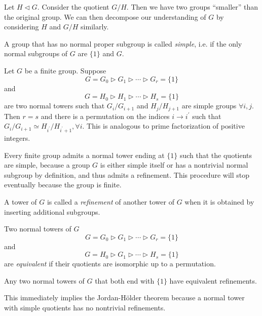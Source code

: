 \documentclass{article}
\begin{document}
Let $H \triangleleft G$. Consider the quotient $G / H$. Then we have
two groups ``smaller'' than the original group. We can then decompose
our understanding of $G$ by considering $H$ and $G/H$ similarly.

\begin{defn}
A group that has no normal proper subgroup is called \emph{simple},
i.e. if the only normal subgroups of $G$ are $\{1\}$ and $G$.
\end{defn}

\begin{theorem}
Let $G$ be a finite group. Suppose 
$$
G = G_0 \triangleright G_1 
        \triangleright \cdots
        \triangleright G_r = \{1\}
$$
and
$$
G = H_0 \triangleright H_1 
        \triangleright \cdots
        \triangleright H_s = \{1\}
$$
are two normal towers such that
$G_i / G_{i+1}$ and $H_j / H_{j+1}$ are simple groups
$\forall i, j$. Then $r = s$ and there is a permutation
on the indices $i \to i^\prime$ such that
$G_i / G_{i+1} \simeq H_{i^\prime} / H_{i^\prime + 1}, \forall
i$. This is analogous to prime factorization of positive integers.
\end{theorem}

\begin{remark}
Every finite group admits a normal tower ending at $\{ 1 \}$ such that
the quotients are simple, because a group $G$ is either simple itself
or has a nontrivial normal subgroup by definition, and thus admits a
refinement. This procedure will stop eventually because the group is finite.
\end{remark}

\begin{defn}[Refinement]
A tower of $G$ is called a \emph{refinement} of another tower of $G$
when it is obtained by inserting additional subgroups.
\end{defn}

\begin{defn}
Two normal towers of $G$ 
$$
G = G_0 \triangleright G_1 
        \triangleright \cdots
        \triangleright G_r = \{1\}
$$
and
$$
G = H_0 \triangleright G_1 
        \triangleright \cdots
        \triangleright H_s = \{1\}
$$
are \emph{equivalent} if their quotients are isomorphic up to a permutation.
\end{defn}

\begin{theorem}[Schreier]
Any two normal towers of $G$ that both end with $\{1\}$ have
equivalent refinements.
\end{theorem}

This immediately implies the Jordan-H\"older theorem because a normal
tower with simple quotients has no nontrivial refinements.
\end{document}
